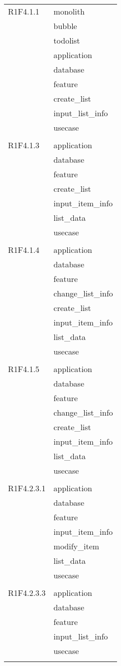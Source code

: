 \begin{center}
\begin{longtable}{|p{7cm}|p{5cm}|}
		R1F4.1.1 & monolith \\ & bubble \\ & todolist \\ & application \\ & database \\ & feature \\ & create\_list \\ & input\_list\_info \\ & usecase \\ & \\ \hline
		R1F4.1.3 & application \\ & database \\ & feature \\ & create\_list \\ & input\_item\_info \\ & list\_data \\ & usecase \\ & \\ \hline
		R1F4.1.4 & application \\ & database \\ & feature \\ & change\_list\_info \\ & create\_list \\ & input\_item\_info \\ & list\_data \\ & usecase \\ & \\ \hline
		R1F4.1.5 & application \\ & database \\ & feature \\ & change\_list\_info \\ & create\_list \\ & input\_item\_info \\ & list\_data \\ & usecase \\ & \\ \hline
		R1F4.2.3.1 & application \\ & database \\ & feature \\ & input\_item\_info \\ & modify\_item \\ & list\_data \\ & usecase \\ & \\ \hline
		R1F4.2.3.3 & application \\ & database \\ & feature \\ & input\_list\_info \\ & usecase \\ & \\ \hline

\end{longtable}
\end{center}
